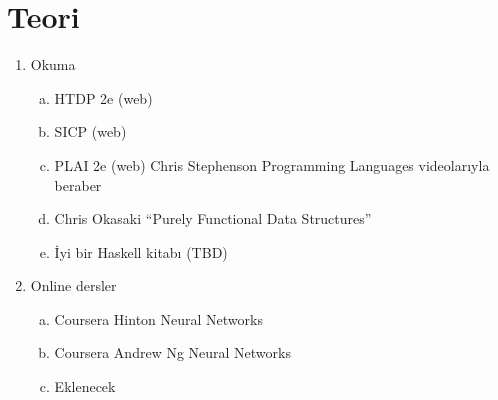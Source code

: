 \documentclass[a4paper,10pt]{article}
\begin{document}
\section*{Teori}
\begin{enumerate}
  \item Okuma
    \begin{enumerate}[(a)]
      \item HTDP 2e (web)
      \item SICP (web)
      \item PLAI 2e (web) Chris Stephenson Programming Languages videolarıyla beraber 
      \item Chris Okasaki ``Purely Functional Data Structures''
      \item İyi bir Haskell kitabı (TBD)
    \end{enumerate}
  \item Online dersler
      \begin{enumerate}[(a)]
      \item Coursera Hinton Neural Networks
      \item Coursera  Andrew Ng Neural Networks
      \item Eklenecek
    \end{enumerate}

\end{enumerate}
\end{document}
